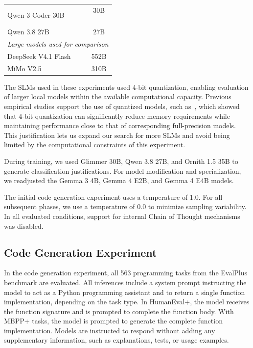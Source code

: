 \begin{table}[htbp]
\begin{tabular}{lc}
Qwen 3 Coder 30B & \shortstack[c]{30B\\{\scriptsize\citep{yang2025qwen3}}\\{\scriptsize\citep{qwenteam2025qwen3coder}}} \\
Qwen 3.8 27B & \shortstack[c]{27B\\{\scriptsize\citep{qwenteam2026qwen38}}} \\
\midrule
\multicolumn{2}{l}{\emph{Large models used for comparison}} \\
\midrule
DeepSeek V4.1 Flash & \shortstack[c]{552B\\{\scriptsize\citep{deepseekai2026deepseekv41flash}}} \\
MiMo V2.5 & \shortstack[c]{310B\\{\scriptsize\citep{xiaomimimo2026mimov25}}} \\
\bottomrule
\end{tabular}
\end{table}

The SLMs used in these experiments used 4-bit quantization, enabling evaluation of larger local models within the available computational capacity. Previous empirical studies support the use of quantized models, such as~\citep{giagnorio2026quantization}, which showed that 4-bit quantization can significantly reduce memory requirements while maintaining performance close to that of corresponding full-precision models. This justification lets us expand our search for more SLMs and avoid being limited by the computational constraints of this experiment.

During training, we used Glimmer 30B, Qwen 3.8 27B, and Ornith 1.5 35B to generate classification justifications. For model modification and specialization, we readjusted the Gemma 3 4B, Gemma 4 E2B, and Gemma 4 E4B models.

The initial code generation experiment uses a temperature of 1.0. For all subsequent phases, we use a temperature of 0.0 to minimize sampling variability. In all evaluated conditions, support for internal Chain of Thought mechanisms was disabled.

\subsection{Code Generation Experiment}

In the code generation experiment, all 563 programming tasks from the EvalPlus benchmark are evaluated. All inferences include a system prompt instructing the model to act as a Python programming assistant and to return a single function implementation, depending on the task type. In HumanEval+, the model receives the function signature and is prompted to complete the function body. With MBPP+ tasks, the model is prompted to generate the complete function implementation. Models are instructed to respond without adding any supplementary information, such as explanations, tests, or usage examples.

